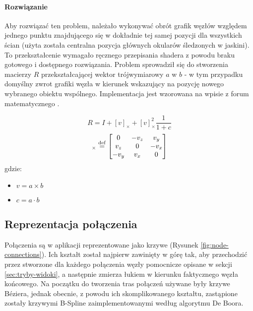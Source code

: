 
\paragraph{Rozwiązanie} Aby rozwiązać ten problem, należało wykonywać obrót grafik węzłów względem jednego punktu znajdującego się w dokładnie tej samej pozycji dla wszystkich ścian (użyta została centralna pozycja głównych okularów śledzonych w jaskini). To przekształcenie wymagało ręcznego przepisania shadera z powodu braku gotowego i dostępnego rozwiązania. Problem sprowadził się do stworzenia macierzy \(R\) przekształcającej wektor trójwymiarowy \(a\) w \(b\) - w tym przypadku domyślny zwrot grafiki węzła w kierunek wskazujący na pozycję nowego wybranego obiektu wspólnego. Implementacja jest wzorowana na wpisie z forum matematycznego \cite{BillboardShaderFormula}.

\newcommand\dotProd{a \cdot b}
\newcommand\crossProd[1]{(\overrightarrow{a \times b})_#1}
\begin{equation}
	R = I + [v]_{\times} + [v]_{\times}^2\frac{1}{1 + c}
\end{equation}
\begin{equation}
	[v]_{\times} \stackrel{\rm def}{=} 
	\begin{bmatrix}
		0 & -v_z & v_y\\
		v_z & 0 & -v_x\\
		-v_y & v_x & 0
	\end{bmatrix}
\end{equation}
gdzie:
\begin{itemize}
	\item \(v = a \times b\)
	\item \(c = a \cdot b\)
\end{itemize}

\subsection{Reprezentacja połączenia}
Połączenia są w aplikacji reprezentowane jako krzywe (Rysunek \ref{fig:node-connections}). Ich kształt został najpierw zawinięty w górę tak, aby przechodzić przez stworzone dla każdego połączenia węzły pomocnicze opisane w sekcji \ref{sec:tryby-widoki}, a następnie zmierza łukiem w kierunku faktycznego węzła końcowego. Na początku do tworzenia tras połączeń używane były krzywe Béziera, jednak obecnie, z powodu ich skomplikowanego kształtu, zastąpione zostały krzywymi B-Spline zaimplementowanymi według algorytmu De Boora.

